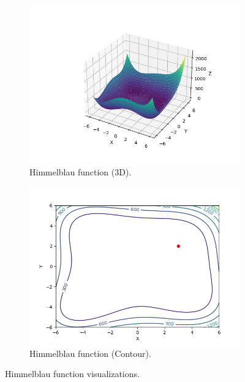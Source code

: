\documentclass[a4paper,12pt]{article}
\begin{document}
\begin{figure}[h!]
    \centering
    \begin{subfigure}[b]{0.45\textwidth}
        \centering
        \includegraphics[width=\textwidth]{images/himmelblau_3d.png}
        \caption{Himmelblau function (3D).}
        \label{fig:himmelblau_3d}
    \end{subfigure}
    \hfill
    \begin{subfigure}[b]{0.45\textwidth}
        \centering
        \includegraphics[width=\textwidth]{images/himmelblau_contour.png}
        \caption{Himmelblau function (Contour).}
        \label{fig:himmelblau_contour}
    \end{subfigure}
    \caption{Himmelblau function visualizations.}
    \label{fig:himmelblau}
\end{figure}
\end{document}
